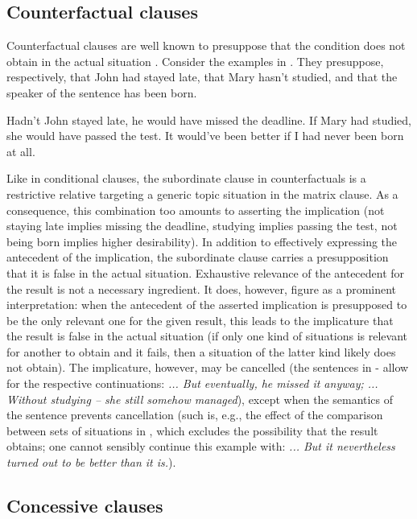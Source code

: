 \documentclass[output=paper,
colorlinks,
citecolor=brown,
newtxmath
]{langscibook}
\begin{document}
\subsection{Counterfactual clauses}

Counterfactual clauses are well known to presuppose that the condition does not obtain in the actual situation \citep{Lewis:1973}. Consider the examples in . They presuppose, respectively, that John had stayed late, that Mary hasn't studied, and that the speaker of the sentence has been born.

\ea\label{ex:Unreal1}
\ea Hadn't John stayed late, he would have missed the deadline.\label{ex:Unreal1-a}
\ex If Mary had studied, she would have passed the test.\label{ex:Unreal1-b}
\ex It would've been better if I had never been born at all.\label{ex:Unreal1-c}
\z\z

\noindent Like in conditional clauses, the subordinate clause in counterfactuals is a restrictive relative targeting a generic topic situation in the matrix clause. As a consequence, this combination too amounts to asserting the implication (not staying late implies missing the deadline, studying implies passing the test, not being born implies higher desirability). In addition to effectively expressing the antecedent of the implication, the subordinate clause carries a presupposition that it is false in the actual situation. Exhaustive relevance of the antecedent for the result is not a necessary ingredient. It does, however, figure as a prominent interpretation: when the antecedent of the asserted implication is presupposed to be the only relevant one for the given result, this leads to the implicature that the result is false in the actual situation (if only one kind of situations is relevant for another to obtain and it fails, then a situation of the latter kind likely does not obtain). The implicature, however, may be cancelled (the sentences in - allow for the respective continuations: \textit{... But eventually, he missed it anyway; ... Without studying -- she still somehow managed}), except when the semantics of the sentence prevents cancellation (such is, e.g., the effect of the comparison between sets of situations in , which excludes the possibility that the result obtains; one cannot sensibly continue this example with: \textit{... But it nevertheless turned out to be better than it is.}).

\subsection{Concessive clauses}
\end{document}
